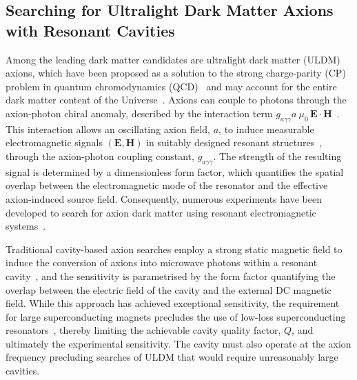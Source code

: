 \documentclass[
  aps,
  physrev,
  reprint,
  superscriptaddress,
  nofootinbib,
  amsmath,
  amssymb
]{revtex4-2}
\begin{document}
\subsection{Searching for Ultralight Dark Matter Axions with Resonant Cavities}
Among the leading dark matter candidates are ultralight dark matter (ULDM) axions, which have been proposed as a solution to the strong charge-parity (CP) problem in quantum chromodynamics (QCD)~\cite{Peccei1977,PQ1977b,Weinberg1978,Wilczek1978} and may account for the entire dark matter content of the Universe~\cite{Di-Luzio:2021wu,Di_Luzio_2021,Sokolov:2021uv,Visinelli19}. Axions can couple to photons through the axion-photon chiral anomaly, described by the interaction term $g_{a\gamma\gamma}a~\mu_0\,\mathbf{E}\cdot\mathbf{H}$~\cite{Peccei1977,Weinberg1978,Wilczek1978,Peccei2008}. This interaction allows an oscillating axion field, $a$, to induce measurable electromagnetic signals $(\mathbf{E},\mathbf{H})$  in suitably designed resonant structures~\cite{Sikivie1985}, through the axion-photon coupling constant, $g_{a\gamma\gamma}$. The strength of the resulting signal is determined by a dimensionless form factor, which quantifies the spatial overlap between the electromagnetic mode of the resonator and the effective axion-induced source field. Consequently, numerous experiments have been developed to search for axion dark matter using resonant electromagnetic systems~\cite{ADMX2018,HAYSTACK2021,ORGAN2022,Thomson2023}.

Traditional cavity-based axion searches employ a strong static magnetic field to induce the conversion of axions into microwave photons within a resonant cavity~\cite{ADMX2018,HAYSTACK2021,ORGAN2022}, and the sensitivity is parametrised by the form factor quantifying the overlap between the electric field of the cavity and the external DC magnetic field. While this approach has achieved exceptional sensitivity, the requirement for large superconducting magnets precludes the use of low-loss superconducting resonators~\cite{Creedon16,Romanenko20,Posen2020,McA21}, thereby limiting the achievable cavity quality factor, $Q$, and ultimately the experimental sensitivity. The cavity must also operate at the axion frequency precluding searches of ULDM that would require unreasonably large cavities.
\end{document}
